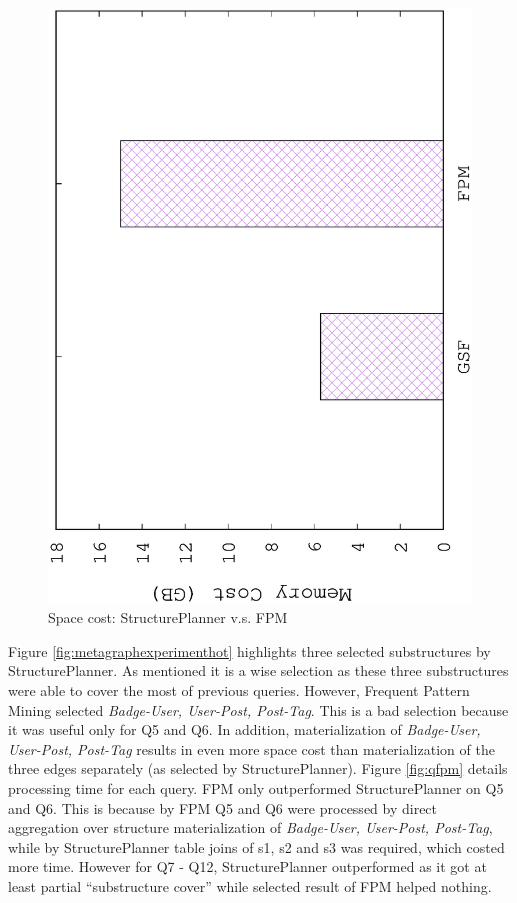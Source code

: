 \begin{figure}[H]
\centering
\includegraphics[scale=0.5, angle=270]{plot/fpm_space}
\caption{Space cost: StructurePlanner v.s. FPM}
\label{fig:fpmspace}
\end{figure}

Figure \ref{fig:metagraphexperimenthot} highlights three selected substructures by StructurePlanner. As mentioned it is a wise selection as these three substructures were able to cover the most of previous queries. However, Frequent Pattern Mining selected \textit{Badge-User, User-Post, Post-Tag}. This is a bad selection because it was useful only for Q5 and Q6. In addition, materialization of \textit{Badge-User, User-Post, Post-Tag} results in even more space cost than materialization of the three edges separately (as selected by StructurePlanner). Figure \ref{fig:qfpm} details processing time for each query. FPM only outperformed StructurePlanner on Q5 and Q6. This is because by FPM Q5 and Q6 were processed by direct aggregation over structure materialization of \textit{Badge-User, User-Post, Post-Tag}, while by StructurePlanner table joins of s1, s2 and s3 was required, which costed more time. However for Q7 - Q12, StructurePlanner outperformed as it got at least partial ``substructure cover'' while selected result of FPM helped nothing.

